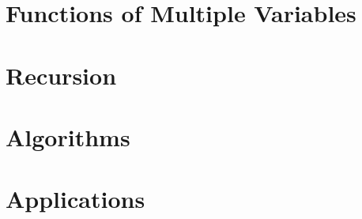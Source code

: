 \documentclass[a4paper,10pt]{report}
\begin{document}
\chapter{Functions of Multiple Variables}

\chapter{Recursion}

\chapter{Algorithms}

\chapter{Applications}


\printglossaries
\end{document}
